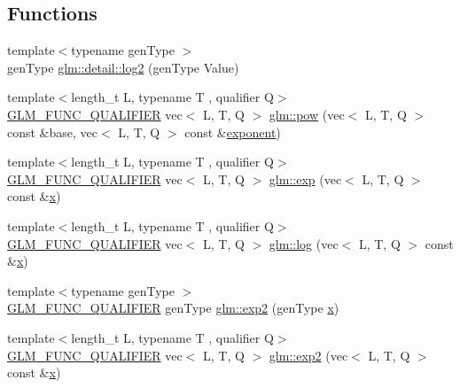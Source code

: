 \subsection*{Functions}
\begin{DoxyCompactItemize}
\item 
{\footnotesize template$<$typename gen\+Type $>$ }\\gen\+Type \mbox{\hyperlink{namespaceglm_1_1detail_a3d24a612f2c5fa4f3aaf97dcd979ef1c}{glm\+::detail\+::log2}} (gen\+Type Value)
\item 
{\footnotesize template$<$length\+\_\+t L, typename T , qualifier Q$>$ }\\\mbox{\hyperlink{setup_8hpp_a33fdea6f91c5f834105f7415e2a64407}{G\+L\+M\+\_\+\+F\+U\+N\+C\+\_\+\+Q\+U\+A\+L\+I\+F\+I\+ER}} vec$<$ L, T, Q $>$ \mbox{\hyperlink{group__core__func__exponential_ga2254981952d4f333b900a6bf5167a6c4}{glm\+::pow}} (vec$<$ L, T, Q $>$ const \&base, vec$<$ L, T, Q $>$ const \&\mbox{\hyperlink{_s_d_l__opengl__glext_8h_a5088c45c98574ff28866140a93356e75}{exponent}})
\item 
{\footnotesize template$<$length\+\_\+t L, typename T , qualifier Q$>$ }\\\mbox{\hyperlink{setup_8hpp_a33fdea6f91c5f834105f7415e2a64407}{G\+L\+M\+\_\+\+F\+U\+N\+C\+\_\+\+Q\+U\+A\+L\+I\+F\+I\+ER}} vec$<$ L, T, Q $>$ \mbox{\hyperlink{group__core__func__exponential_ga071566cadc7505455e611f2a0353f4d4}{glm\+::exp}} (vec$<$ L, T, Q $>$ const \&\mbox{\hyperlink{_s_d_l__opengl_8h_ad0e63d0edcdbd3d79554076bf309fd47}{x}})
\item 
{\footnotesize template$<$length\+\_\+t L, typename T , qualifier Q$>$ }\\\mbox{\hyperlink{setup_8hpp_a33fdea6f91c5f834105f7415e2a64407}{G\+L\+M\+\_\+\+F\+U\+N\+C\+\_\+\+Q\+U\+A\+L\+I\+F\+I\+ER}} vec$<$ L, T, Q $>$ \mbox{\hyperlink{group__core__func__exponential_ga918c9f3fd086ce20e6760c903bd30fa9}{glm\+::log}} (vec$<$ L, T, Q $>$ const \&\mbox{\hyperlink{_s_d_l__opengl_8h_ad0e63d0edcdbd3d79554076bf309fd47}{x}})
\item 
{\footnotesize template$<$typename gen\+Type $>$ }\\\mbox{\hyperlink{setup_8hpp_a33fdea6f91c5f834105f7415e2a64407}{G\+L\+M\+\_\+\+F\+U\+N\+C\+\_\+\+Q\+U\+A\+L\+I\+F\+I\+ER}} gen\+Type \mbox{\hyperlink{namespaceglm_a8f6240c6756f850537398b1af2751c4b}{glm\+::exp2}} (gen\+Type \mbox{\hyperlink{_s_d_l__opengl_8h_ad0e63d0edcdbd3d79554076bf309fd47}{x}})
\item 
{\footnotesize template$<$length\+\_\+t L, typename T , qualifier Q$>$ }\\\mbox{\hyperlink{setup_8hpp_a33fdea6f91c5f834105f7415e2a64407}{G\+L\+M\+\_\+\+F\+U\+N\+C\+\_\+\+Q\+U\+A\+L\+I\+F\+I\+ER}} vec$<$ L, T, Q $>$ \mbox{\hyperlink{group__core__func__exponential_gaff17ace6b579a03bf223ed4d1ed2cd16}{glm\+::exp2}} (vec$<$ L, T, Q $>$ const \&\mbox{\hyperlink{_s_d_l__opengl_8h_ad0e63d0edcdbd3d79554076bf309fd47}{x}})

\end{DoxyCompactItemize}
